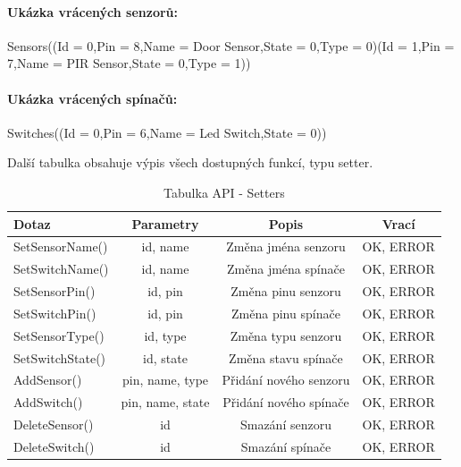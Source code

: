 \documentclass[FM,DP]{tulthesis}  %
\begin{document}
\paragraph{Ukázka vrácených senzorů:}
\begin{center}
Sensors((Id = 0,Pin = 8,Name = Door Sensor,State = 0,Type = 0)(Id = 1,Pin = 7,Name = PIR Sensor,State = 0,Type = 1))
\end{center} 

\paragraph{Ukázka vrácených spínačů:}
\begin{center}
Switches((Id = 0,Pin = 6,Name = Led Switch,State = 0))
\end{center} 

Další tabulka obsahuje výpis všech dostupných funkcí, typu setter.

\renewcommand{\arraystretch}{1.5}
\begin{table}[H]
\begin{center}
\begin{tabular}{| l | c | c| c |}
\hline
Dotaz & Parametry & Popis & Vrací\\
\hline
\hline
SetSensorName() & id, name & Změna jména senzoru & OK, ERROR \\
\hline
SetSwitchName() & id, name & Změna jména spínače & OK, ERROR \\
\hline
SetSensorPin() & id, pin & Změna pinu senzoru & OK, ERROR \\
\hline
SetSwitchPin() & id, pin & Změna pinu spínače & OK, ERROR \\
\hline
SetSensorType() & id, type & Změna typu senzoru & OK, ERROR \\
\hline
SetSwitchState() & id, state & Změna stavu spínače & OK, ERROR \\
\hline
AddSensor() & pin, name, type & Přidání nového senzoru & OK, ERROR \\
\hline
AddSwitch() & pin, name, state & Přidání nového spínače & OK, ERROR \\
\hline
DeleteSensor() & id & Smazání senzoru & OK, ERROR \\
\hline
DeleteSwitch() & id & Smazání spínače & OK, ERROR \\
\hline
\end{tabular}
\end{center}
\caption{Tabulka API - Setters}
\end{table}
\end{document}
